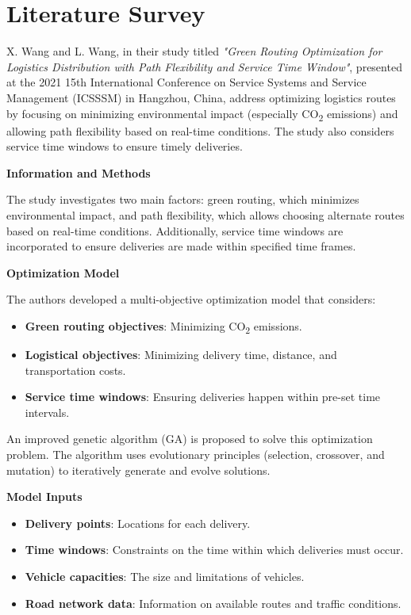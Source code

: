 \chapter{Literature Survey}

X. Wang and L. Wang, in their study titled \textit{"Green Routing Optimization for Logistics Distribution with Path Flexibility and Service Time Window"}, presented at the 2021 15th International Conference on Service Systems and Service Management (ICSSSM) in Hangzhou, China, address optimizing logistics routes by focusing on minimizing environmental impact (especially CO\textsubscript{2} emissions) and allowing path flexibility based on real-time conditions. The study also considers service time windows to ensure timely deliveries.

\textbf{Information and Methods}

The study investigates two main factors: green routing, which minimizes environmental impact, and path flexibility, which allows choosing alternate routes based on real-time conditions. Additionally, service time windows are incorporated to ensure deliveries are made within specified time frames.

\textbf{Optimization Model}

The authors developed a multi-objective optimization model that considers:
\begin{itemize}
    \item \textbf{Green routing objectives}: Minimizing CO\textsubscript{2} emissions.
    \item \textbf{Logistical objectives}: Minimizing delivery time, distance, and transportation costs.
    \item \textbf{Service time windows}: Ensuring deliveries happen within pre-set time intervals.
\end{itemize}

An improved genetic algorithm (GA) is proposed to solve this optimization problem. The algorithm uses evolutionary principles (selection, crossover, and mutation) to iteratively generate and evolve solutions.

\textbf{Model Inputs}
\begin{itemize}
    \item \textbf{Delivery points}: Locations for each delivery.
    \item \textbf{Time windows}: Constraints on the time within which deliveries must occur.
    \item \textbf{Vehicle capacities}: The size and limitations of vehicles.
    \item \textbf{Road network data}: Information on available routes and traffic conditions.
\end{itemize}

